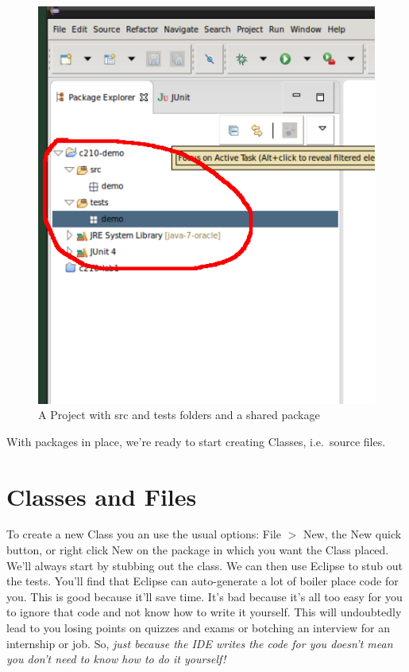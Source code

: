 \documentclass[nobib]{tufte-handout}
\begin{document}
\vspace{.1in}
\begin{center}
\begin{figure}[h]
\includegraphics[scale=.5]{Eclipse-ProjectWithPacks.png}
\caption{A Project with src and tests folders and a shared package}
\label{fig:projWithPacks}
\end{figure}
\end{center}
\vspace{.1in}

With packages in place, we're ready to start creating Classes, i.e.\ source files.

\section{Classes and Files}

To create a new Class you an use the usual options: File $>$ New, the New quick button, or right click New on the package in which you want the Class placed. We'll always start by stubbing out the class. We can then use Eclipse to stub out the tests. You'll find that Eclipse can auto-generate a lot of boiler place code for you. This is good because it'll save time. It's bad because it's all too easy for you to ignore that code and not know how to write it yourself. This will undoubtedly lead to you losing points on quizzes and exams or botching an interview for an internship or job. So, \textit{just because the IDE writes the code for you doesn't mean you don't need to know how to do it yourself!}
\end{document}
